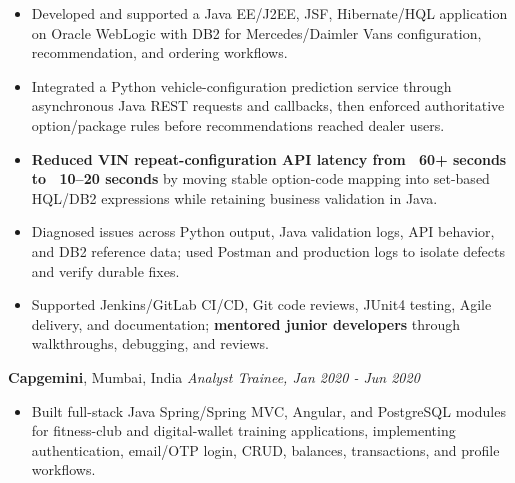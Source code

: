 \documentclass[11pt,letterpaper]{article}
\begin{document}
\begin{itemize}
  \item Developed and supported a Java EE/J2EE, JSF, Hibernate/HQL application on Oracle WebLogic with DB2 for Mercedes/Daimler Vans configuration, recommendation, and ordering workflows.
  \item Integrated a Python vehicle-configuration prediction service through asynchronous Java REST requests and callbacks, then enforced authoritative option/package rules before recommendations reached dealer users.
  \item \textbf{Reduced VIN repeat-configuration API latency from ~60+ seconds to ~10--20 seconds} by moving stable option-code mapping into set-based HQL/DB2 expressions while retaining business validation in Java.
  \item Diagnosed issues across Python output, Java validation logs, API behavior, and DB2 reference data; used Postman and production logs to isolate defects and verify durable fixes.
  \item Supported Jenkins/GitLab CI/CD, Git code reviews, JUnit4 testing, Agile delivery, and documentation; \textbf{mentored junior developers} through walkthroughs, debugging, and reviews.
\end{itemize}
\textbf{Capgemini}, Mumbai, India \hfill \textit{Analyst Trainee, Jan 2020 - Jun 2020}
\begin{itemize}
  \item Built full-stack Java Spring/Spring MVC, Angular, and PostgreSQL modules for fitness-club and digital-wallet training applications, implementing authentication, email/OTP login, CRUD, balances, transactions, and profile workflows.
\end{itemize}
\end{document}
